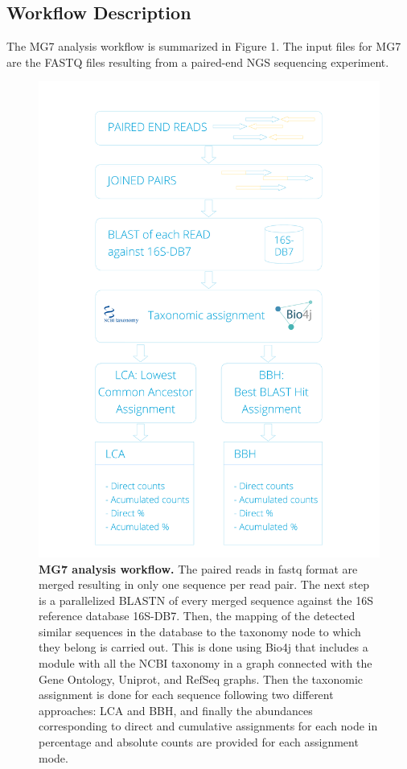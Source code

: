 \documentclass[fontsize=8pt,paper=a4,pagesize,abstracton]{scrartcl}
\makeatletter
\def\maxwidth{\ifdim\Gin@nat@width>\linewidth\linewidth
\else\Gin@nat@width\fi}
\let\Oldincludegraphics\includegraphics
\renewcommand{\includegraphics}[1]{\Oldincludegraphics[width=\maxwidth]{#1}}
\makeatother
\begin{document}
\subsection{Workflow Description}\label{workflow-description}

The MG7 analysis workflow is summarized in Figure 1. The input files for
MG7 are the FASTQ files resulting from a paired-end NGS sequencing
experiment.

\begin{figure}[htbp]
\centering
\includegraphics{Figure-1.jpg}
\caption{\textbf{MG7 analysis workflow.} The paired reads in fastq
format are merged resulting in only one sequence per read pair. The next
step is a parallelized BLASTN of every merged sequence against the 16S
reference database 16S-DB7. Then, the mapping of the detected similar
sequences in the database to the taxonomy node to which they belong is
carried out. This is done using Bio4j that includes a module with all
the NCBI taxonomy in a graph connected with the Gene Ontology, Uniprot,
and RefSeq graphs. Then the taxonomic assignment is done for each
sequence following two different approaches: LCA and BBH, and finally
the abundances corresponding to direct and cumulative assignments for
each node in percentage and absolute counts are provided for each
assignment mode.}
\end{figure}
\end{document}
